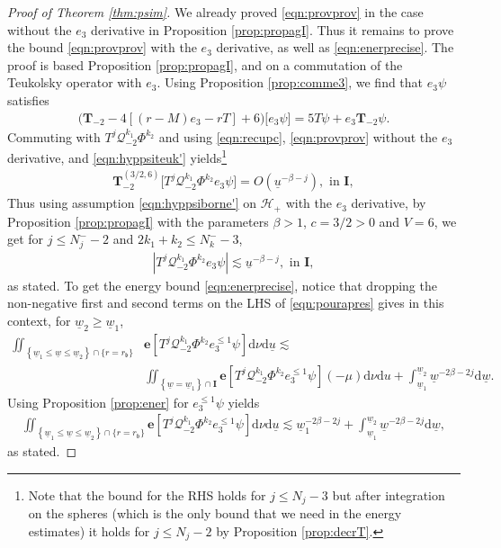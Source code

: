 \documentclass[reqno]{amsart}
\numberwithin{equation}{section}
\newcommand{\mch}{\mathcal{H}}
\newcommand{\mcq}{\mathcal{Q}}
\newcommand{\wbar}{\underline{w}}
\newcommand{\ubar}{{\underline{u}}}
\newcommand{\carterm}{\mcq_{-2}}
\newcommand{\dee}{\mathrm{d}}
\newcommand{\teuk}{\mathbf{T}}
\newcommand{\un}{\mathbf{I}}
\newcommand{\rb}{r_\mathfrak{b}}
\theoremstyle{plain}
\theoremstyle{definition}
\theoremstyle{remark}
\numberwithin{equation}{section}
\begin{document}
\begin{proof}[Proof of Theorem \ref{thm:psim}]
    We already proved \eqref{eqn:provprov} in the case without the $e_3$ derivative in Proposition \ref{prop:propagI}. Thus it remains to prove the bound \eqref{eqn:provprov} with the $e_3$ derivative, as well as \eqref{eqn:enerprecise}. The proof is based Proposition \ref{prop:propagI}, and on a commutation of the Teukolsky operator with $e_3$. Using Proposition \ref{prop:comme3}, we find that $e_3\psi$ satisfies
\begin{align*}
    \Big(\teuk_{-2}-4[(r-M)e_3-rT]+6\Big)\Big[e_3\psi\Big]=5T\psi+e_3\teuk_{-2}\psi.
\end{align*}
Commuting with $T^j\carterm^{k_1}\Phi^{k_2}$ and using \eqref{eqn:recupc}, \eqref{eqn:provprov} without the $e_3$ derivative, and \eqref{eqn:hyppsiteuk'} yields\footnote{Note that the bound for the RHS holds for $j\leq N_j-3$ but after integration on the spheres (which is the only bound that we need in the energy estimates) it holds for $j\leq N_j-2$ by Proposition \ref{prop:decrT}.}
\begin{align}\label{eqn:inun}
    \teuk_{-2}^{(3/2,6)}\Big[T^j\carterm^{k_1}\Phi^{k_2}e_3\psi\Big]=O(\ubar^{-\beta-j}),\text{   in   }\un,
\end{align}
Thus using assumption \eqref{eqn:hyppsiborne'} on $\mch_+$ with the $e_3$ derivative, by Proposition \ref{prop:propagI} with the parameters $\beta>1$, $c=3/2>0$ and $V=6$, we get for $j\leq N_j^--2$ and $2k_1+k_2\leq N_k^--3$,
\begin{align*}
    |T^j\carterm^{k_1}\Phi^{k_2}e_3\psi|\lesssim\ubar^{-\beta-j},\text{   in   }\un,
\end{align*}
as stated. To get the energy bound \eqref{eqn:enerprecise}, notice that dropping the non-negative first and second terms on the LHS of \eqref{eqn:pourapres} gives in this context, for $\wbar_2\geq\wbar_1$,
\begin{align*}
 \iint_{\left\{\underline{w}_1 \leq \underline{w} \leq \underline{w}_2\right\} \cap \{r=\rb\}} &\mathbf{e}[T^j\carterm^{k_1}\Phi^{k_2}e_3^{\leq 1}\psi]\dee\nu\mathrm{d} \underline{u}\lesssim\\
 &\iint_{\left\{\underline{w}=\underline{w}_1\right\} \cap \mathbf{I}} \mathbf{e}[T^j\carterm^{k_1}\Phi^{k_2}e_3^{\leq 1}\psi](-\mu) \dee\nu \mathrm{d} u+\int_{\underline{w}_1}^{\underline{w}_2} \underline{w}^{-2\beta-2j} \mathrm{d} \underline{w}.\nonumber
\end{align*}
Using Proposition \ref{prop:ener} for $e_3^{\leq 1}\psi$ yields 
\begin{align*}
 \iint_{\left\{\underline{w}_1 \leq \underline{w} \leq \underline{w}_2\right\} \cap \{r=\rb\}} \mathbf{e}[T^j\carterm^{k_1}\Phi^{k_2}e_3^{\leq 1}\psi]\dee\nu\mathrm{d} \underline{u}\lesssim\wbar_1^{-2\beta-2j}+\int_{\underline{w}_1}^{\underline{w}_2} \underline{w}^{-2\beta-2j} \mathrm{d} \underline{w},
\end{align*}
as stated.
\end{proof}
\end{document}
